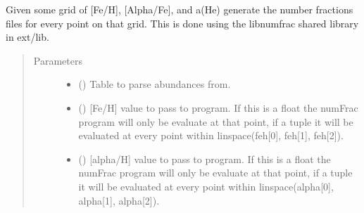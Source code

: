 \documentclass[letterpaper,10pt,english]{sphinxmanual}
\begin{document}
\begin{fulllineitems}
\label{\detokenize{pyTOPSScrape.ext:pyTOPSScrape.ext.utils.call_num_frac}}
\sphinxAtStartPar
Given some grid of {[}Fe/H{]}, {[}Alpha/Fe{]}, and a(He) generate the number
fractions files for every point on that grid. This is done using the
libnumfrac shared library in ext/lib.
\begin{quote}\begin{description}
\item[{Parameters}] \leavevmode\begin{itemize}
\item {} 
\sphinxAtStartPar
{} () \textendash{} Table to parse abundances from.

\item {} 
\sphinxAtStartPar
{} () \textendash{} {[}Fe/H{]} value to pass to program. If this is a float the numFrac
program will only be evaluate at that point, if a tuple it will be
evaluated at every point within linspace(feh{[}0{]}, feh{[}1{]}, feh{[}2{]}).

\item {} 
\sphinxAtStartPar
{} () \textendash{} {[}alpha/H{]} value to pass to program. If this is a float the numFrac
program will only be evaluate at that point, if a tuple it will be
evaluated at every point within linspace(alpha{[}0{]}, alpha{[}1{]},
alpha{[}2{]}).


\end{itemize}
\end{description}
\end{quote}
\end{fulllineitems}
\end{document}

